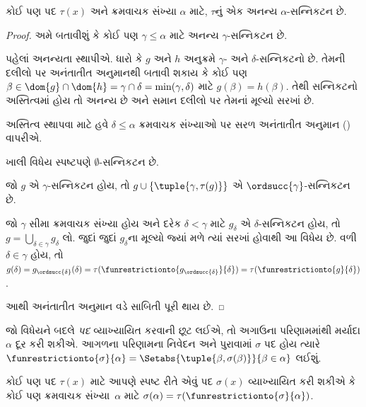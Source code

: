 \begin{lem}[મર્યાદિત પુનરાવર્તન]
કોઈ પણ પદ $\tau(x)$ અને ક્રમવાચક સંખ્યા $\alpha$ માટે,
$\tau$નું એક અનન્ય $\alpha$-સન્નિકટન છે.
\end{lem}
\begin{proof}
અમે બતાવીશું કે કોઈ પણ $\gamma \leq \alpha$ માટે અનન્ય
$\gamma$-સન્નિકટન છે.

પહેલાં અનન્યતા સ્થાપીએ. ધારો કે $g$ અને $h$ અનુક્રમે
$\gamma$- અને $\delta$-સન્નિકટનો છે. તેમની દલીલો પર
અનંતાતીત અનુમાનથી બતાવી શકાય કે કોઈ પણ
$\beta \in \dom{g} \cap \dom{h} =
\gamma \cap \delta = \min(\gamma, \delta)$ માટે
$g(\beta) = h(\beta)$. તેથી સન્નિકટનો અસ્તિત્વમાં હોય તો
અનન્ય છે અને સમાન દલીલો પર તેમનાં મૂલ્યો સરખાં છે.

અસ્તિત્વ સ્થાપવા માટે હવે $\delta \leq \alpha$ ક્રમવાચક
સંખ્યાઓ પર સરળ અનંતાતીત અનુમાન
() વાપરીએ.

ખાલી વિધેય સ્પષ્ટપણે $\emptyset$-સન્નિકટન છે.

જો $g$ એ $\gamma$-સન્નિકટન હોય, તો $g \cup
\{\tuple{\gamma, \tau(g)}\}$ એ $\ordsucc{\gamma}$-સન્નિકટન છે.

જો $\gamma$ સીમા ક્રમવાચક સંખ્યા હોય અને દરેક $\delta < \gamma$
માટે $g_\delta$ એ $\delta$-સન્નિકટન હોય, તો
$g = \bigcup_{\delta \in \gamma} g_\delta$ લો. જુદાં જુદાં
$g_\delta$ના મૂલ્યો જ્યાં મળે ત્યાં સરખાં હોવાથી આ વિધેય છે.
વળી $\delta \in \gamma$ હોય, તો
$g(\delta) = g_{\ordsucc{\delta}}(\delta) =
\tau(\funrestrictionto{g_{\ordsucc{\delta}}}{\delta}) =
\tau(\funrestrictionto{g}{\delta})$.

આથી અનંતાતીત અનુમાન વડે સાબિતી પૂરી થાય છે.
\end{proof}

જો વિધેયને બદલે \emph{પદ} વ્યાખ્યાયિત કરવાની છૂટ લઈએ, તો અગાઉના
પરિણામમાંથી મર્યાદા $\alpha$ દૂર કરી શકીએ. આગળના પરિણામના નિવેદન
અને પુરાવામાં $\sigma$ પદ હોય ત્યારે
$\funrestrictionto{\sigma}{\alpha} = \Setabs{\tuple{\beta,
\sigma(\beta)}}{\beta \in \alpha}$ લઈશું.

\begin{thm}[સામાન્ય પુનરાવર્તન]
કોઈ પણ પદ $\tau(x)$ માટે આપણે સ્પષ્ટ રીતે એવું પદ
$\sigma(x)$ વ્યાખ્યાયિત કરી શકીએ કે કોઈ પણ ક્રમવાચક
સંખ્યા~$\alpha$ માટે
$\sigma(\alpha) = \tau(\funrestrictionto{\sigma}{\alpha})$.
\end{thm}

